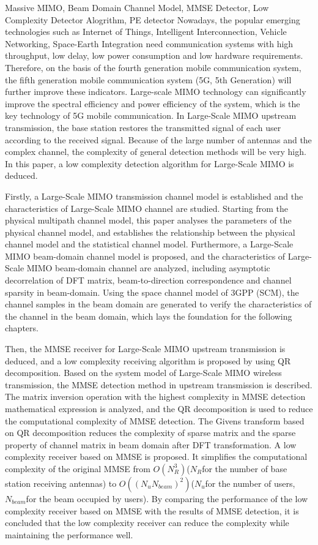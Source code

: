 \documentclass[bachelor,nocolorlinks, printoneside]{seuthesis} %
\begin{document}
\begin{englishabstract}{Massive MIMO, Beam Domain Channel Model, MMSE Detector, Low Complexity Detector Alogrithm, PE detector}
Nowadays, the popular emerging technologies such as Internet of Things, Intelligent Interconnection, Vehicle Networking, Space-Earth Integration need communication systems with high throughput, low delay, low power consumption and low hardware requirements. Therefore, on the basis of the fourth generation mobile communication system, the fifth generation mobile communication system (5G, 5th Generation) will further improve these indicators. Large-scale MIMO technology can significantly improve the spectral efficiency and power efficiency of the system, which is the key technology of 5G mobile communication. In Large-Scale MIMO upstream transmission, the base station restores the transmitted signal of each user according to the received signal. Because of the large number of antennas and the complex channel, the complexity of general detection methods will be very high. In this paper, a low complexity detection algorithm for Large-Scale MIMO is deduced.

Firstly, a Large-Scale MIMO transmission channel model is established and the characteristics of Large-Scale MIMO channel are studied. Starting from the physical multipath channel model, this paper analyses the parameters of the physical channel model, and establishes the relationship between the physical channel model and the statistical channel model. Furthermore, a Large-Scale MIMO beam-domain channel model is proposed, and the characteristics of Large-Scale MIMO beam-domain channel are analyzed, including asymptotic decorrelation of DFT matrix, beam-to-direction correspondence and channel sparsity in beam-domain. Using the space channel model of 3GPP (SCM), the channel samples in the beam domain are generated to verify the characteristics of the channel in the beam domain, which lays the foundation for the following chapters.

Then, the MMSE receiver for Large-Scale MIMO upstream transmission is deduced, and a low complexity receiving algorithm is proposed by using QR decomposition. Based on the system model of Large-Scale MIMO wireless transmission, the MMSE detection method in upstream transmission is described. The matrix inversion operation with the highest complexity in MMSE detection mathematical expression is analyzed, and the QR decomposition is used to reduce the computational complexity of MMSE detection. The Givens transform based on QR decomposition reduces the complexity of sparse matrix and the sparse property of channel matrix in beam domain after DFT transformation. A low complexity receiver based on MMSE is proposed. It simplifies the computational complexity of the original MMSE from $O(N_R^3)$($N_R$for the number of base station receiving antennas) to $O((N_uN_{beam}) ^2)$($N_u$for the number of users, $N_{beam}$for the beam occupied by users). By comparing the performance of the low complexity receiver based on MMSE with the results of MMSE detection, it is concluded that the low complexity receiver can reduce the complexity while maintaining the performance well.


\end{englishabstract}
\end{document}
